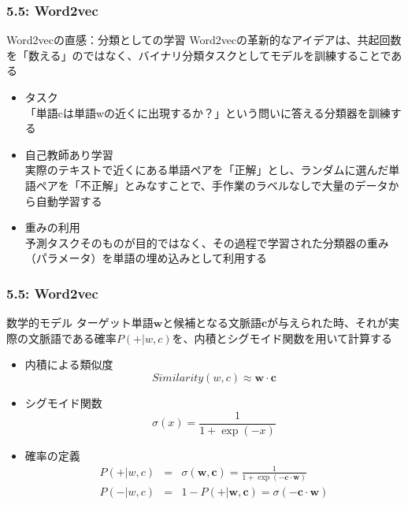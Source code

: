 \documentclass[unicode,11pt]{beamer} %
\begin{document}
\begin{frame}
    \frametitle{5.5: Word2vec}
    \begin{alertblock}{Word2vecの直感：分類としての学習}
        Word2vecの革新的なアイデアは、共起回数を「数える」のではなく、バイナリ分類タスクとしてモデルを訓練することである
        \begin{itemize}
            \item タスク\\「単語cは単語wの近くに出現するか？」という問いに答える分類器を訓練する
            \item 自己教師あり学習\\実際のテキストで近くにある単語ペアを「正解」とし、ランダムに選んだ単語ペアを「不正解」とみなすことで、手作業のラベルなしで大量のデータから自動学習する
            \item 重みの利用\\予測タスクそのものが目的ではなく、その過程で学習された分類器の重み（パラメータ）を単語の埋め込みとして利用する
        \end{itemize}
    \end{alertblock}
\end{frame}

\begin{frame}
    \frametitle{5.5: Word2vec}
    \begin{alertblock}{数学的モデル}
        ターゲット単語$\boldsymbol{w}$と候補となる文脈語$\boldsymbol{c}$が与えられた時、それが実際の文脈語である確率$P(+|w, c)$を、内積とシグモイド関数を用いて計算する
        \begin{itemize}
            \item 内積による類似度
            \begin{equation*}
                Similarity(w, c) \approx \boldsymbol{w} \cdot \boldsymbol{c}
            \end{equation*}
            \item シグモイド関数
            \begin{equation*}
                \sigma(x) = \frac{1}{1 + \exp(-x)}
            \end{equation*}
            \item 確率の定義
            \begin{eqnarray*} 
                P(+|w, c) &=& \sigma(\boldsymbol{w}, \boldsymbol{c}) = \frac{1}{1 + \exp(-\boldsymbol{c} \cdot \boldsymbol{w})} \\
                P(-|w, c) &=& 1 - P(+|\boldsymbol{w}, \boldsymbol{c}) = \sigma(-\boldsymbol{c} \cdot \boldsymbol{w})
            \end{eqnarray*}
        \end{itemize}
    \end{alertblock}
\end{frame}
\end{document}
